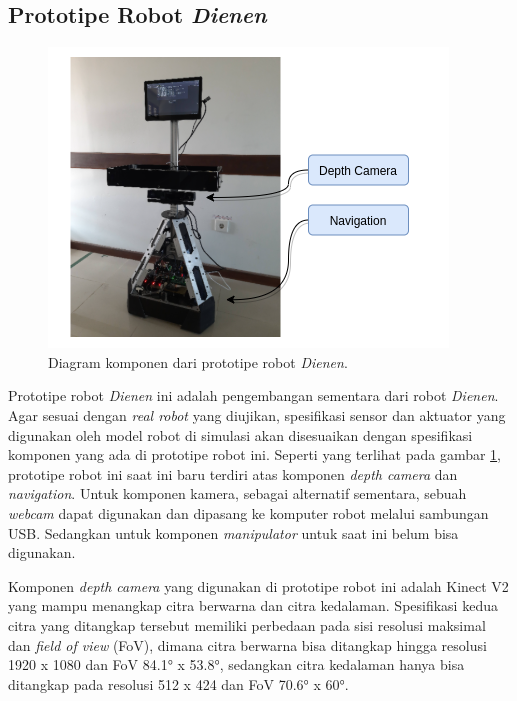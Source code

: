\subsection{Prototipe Robot \emph{Dienen}}
\label{subsec:prototiperobotdienen}

\begin{figure} [ht]
  \centering
  \includegraphics[scale=0.5]{gambar/komponen-prototipe-robot.png}
  \caption{Diagram komponen dari prototipe robot \emph{Dienen}.}
  \label{fig:komponenprototiperobot}
\end{figure}

Prototipe robot \emph{Dienen} ini adalah pengembangan sementara dari robot \emph{Dienen}.
Agar sesuai dengan \emph{real robot} yang diujikan,
  spesifikasi sensor dan aktuator yang digunakan oleh model robot di simulasi akan disesuaikan dengan spesifikasi komponen yang ada di prototipe robot ini.
Seperti yang terlihat pada gambar \ref{fig:komponenprototiperobot},
  prototipe robot ini saat ini baru terdiri atas komponen \emph{depth camera} dan \emph{navigation}.
Untuk komponen kamera, sebagai alternatif sementara, sebuah \emph{webcam} dapat digunakan dan dipasang ke komputer robot melalui sambungan USB.
Sedangkan untuk komponen \emph{manipulator} untuk saat ini belum bisa digunakan.

Komponen \emph{depth camera} yang digunakan di prototipe robot ini adalah Kinect V2 yang mampu menangkap citra berwarna dan citra kedalaman.
Spesifikasi kedua citra yang ditangkap tersebut memiliki perbedaan pada sisi resolusi maksimal dan \emph{field of view} (FoV),
  dimana citra berwarna bisa ditangkap hingga resolusi 1920 x 1080 dan FoV 84.1° x 53.8°,
  sedangkan citra kedalaman hanya bisa ditangkap pada resolusi 512 x 424 dan FoV 70.6° x 60°.

